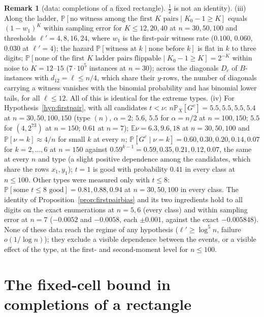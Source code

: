 \documentclass[11pt]{article}
\theoremstyle{definition}
\newtheorem{remark}[theorem]{Remark}
\newcommand{\E}{\mathbb{E}}
\renewcommand{\Pr}{\mathbb{P}}
\begin{document}
\begin{remark}[data: completions of a fixed rectangle]
$\tfrac12$ is not an identity).
(iii) Along the ladder, $\Pr[\text{no witness among the first }K\text{ pairs}\mid K_0-1\ge K]$
equals $(1-w_1)^K$ within sampling error for $K\le12,20,40$ at $n=30,50,100$ and
thresholds $\ell'=4,8,16,24$, where $w_1$ is the first-pair witness rate ($0.100$, $0.060$,
$0.030$ at $\ell'=4$); the hazard $\Pr[\text{witness at }k\mid\text{none before }k]$ is
flat in $k$ to three digits; $\Pr[\text{none of the first }K\text{ ladder pairs flippable}\mid K_0-1\ge K]=2^{-K}$
within noise to $K=12$--$15$ ($7\cdot10^5$ instances at $n=30$); across the diagonals $D_c$ of
$B$-instances with $d_{12}=\ell\le n/4$, which share their $y$-rows, the number of
diagonals carrying a witness vanishes with the binomial probability and has binomial
lower tails, for all $\ell\le12$.
All of this is identical for the extreme types.
(iv) For Hypothesis~\ref{hyp:firstpair}, with all candidates $t<\nu$:
$n\Pr_X[G^c]=5.5,5.5,5.5,5.4$ at $n=30,50,100,150$ (type $(n)$, $\alpha=2$; $5.6$, $5.5$
for $\alpha=n/2$ at $n=100,150$; $5.5$ for $(4,2^{73})$ at $n=150$; $0.61$ at $n=7$);
$\E\nu=6.3,9.6,18$ at $n=30,50,100$ and $\Pr[\nu=k]\approx4/n$ for small $k$ at every $n$;
$\Pr[G^c\mid\nu=k]=0.60,0.30,0.20,0.14,0.07$ for $k=2,\dots,6$ at $n=150$ against
$0.59^{k-1}=0.59,0.35,0.21,0.12,0.07$, the same at every $n$ and type (a slight positive
dependence among the candidates, which share the rows $x_1,y_1$); $t=1$ is good with
probability $0.41$ in every class at $n\le100$.  Other
types were measured only with $t\le8$: $\Pr[\text{some }t\le8\text{ good}]=0.81,0.88,0.94$
at $n=30,50,100$ in every class.  The identity of
Proposition~\ref{prop:firstpairbias} and its two ingredients hold to all digits on the
exact enumerations at $n=5,6$ (every class) and within sampling error at $n=7$ ($-0.0052$
and $-0.0058$, each $\pm0.001$, against the exact $-0.005848$).
None of these data reach the regime of any hypothesis ($\ell'\ge\log^5n$, failure
$o(1/\log n)$); they exclude a visible dependence between the events, or a visible effect
of the type, at the first- and second-moment level for $n\le100$.
\end{remark}


\section{The fixed-cell bound in completions of a rectangle}\label{sec:fc}
\end{document}
